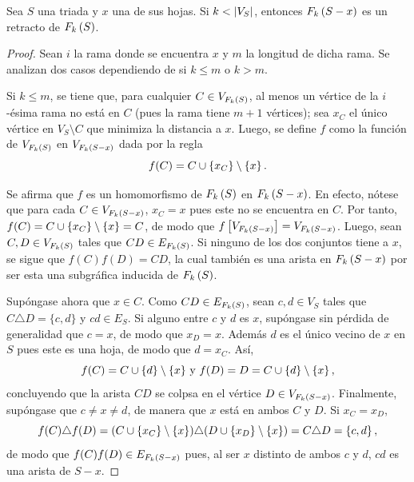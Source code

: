 \begin{lema}
\label{lem:retracto_triada}
    Sea $S$ una triada y $x$ una de sus hojas. Si $k<\left|V_S\right|$, entonces
    $F_{k}\left( S-x\right)$ es un retracto de $F_{k}\left( S\right)$.
\end{lema}

\begin{proof}
    Sean $i$ la rama donde se encuentra $x$ y $m$ la longitud de dicha rama. Se
    analizan dos casos dependiendo de si $k\leq m$ o $k>m$. 
    
    Si $k\leq m$, se tiene que, para cualquier $C\in V_{F_{k}\left( S\right)}$, al menos un
    v\'ertice de la $i$-\'esima rama no est\'a en $C$ (pues la rama tiene $m+1$
    v\'ertices); sea $x_C$ el \'unico v\'ertice en $V_S \setminus C$ que
    minimiza la distancia a $x$. Luego, se define $f$ como la funci\'on de
    $V_{F_{k}\left( S\right)}$ en $V_{F_{k}\left( S-x\right)}$ dada por la regla 
    \[
        f(C)=C\cup\left\{ x_C\right\}\setminus \left\{ x\right\}.
    \]

    Se afirma que $f$ es un homomorfismo de $F_{k}\left( S\right)$ en $F_{k}\left( S-x\right)$. En
    efecto, n\'otese que para cada $C\in V_{F_{k}\left( S-x\right)}$, $x_C=x$ pues este no
    se encuentra en $C$. Por tanto, $f(C) = C\cup\left\{ x_C\right\}\setminus \left\{ x\right\} = C$, de
    modo que $f\left[ V_{F_{k}\left( S-x\right)}\right]= V_{F_{k}\left( S-x\right)}$. Luego, sean $C,D\in
    V_{F_{k}\left( S\right)}$ tales que $CD\in E_{F_{k}\left( S\right)}$. Si ninguno de los dos
    conjuntos tiene a $x$, se sigue que $f(C)f(D)=CD$, la cual tambi\'en es una
    arista en $F_{k}\left( S-x\right)$ por ser esta una subgr\'afica inducida de $F_{k}\left( S\right)$.

    Sup\'ongase ahora que $x\in C$. Como $CD\in E_{F_{k}\left( S\right)}$, sean $c,d\in V_S$
    tales que $C\triangle D = \{c,d\}$ y $cd \in E_S$. Si alguno entre $c$ y $d$
    es $x$, sup\'ongase sin p\'erdida de generalidad que $c=x$, de modo que
    $x_D=x$. Adem\'as $d$ es el \'unico vecino de $x$ en $S$ pues este es una
    hoja, de modo que $d=x_C$. As\'i, 
    \[
        f(C)=C\cup\left\{ d\right\}\setminus\{x\} \text { y } f(D)=D = C \cup \left\{ d\right\} \setminus 
        \left\{ x\right\},
    \]
    concluyendo que la arista $CD$ se colpsa en el v\'ertice $D\in
    V_{F_{k}\left( S-x\right)}$. Finalmente, sup\'ongase que $c\neq x\neq d$, de manera que
    $x$ est\'a en ambos $C$ y $D$. Si $x_C=x_D$,
    \[
        f(C)\triangle f(D)= (C\cup\left\{ x_C\right\}\setminus \left\{ x\right\})\triangle(D\cup\left\{ x_D\right\}
        \setminus \left\{ x\right\}) = C\triangle D=\left\{ c,d\right\},
    \]
    de modo que $f(C)f(D)\in E_{F_{k}\left( S-x\right)}$ pues, al ser $x$ distinto de ambos
    $c$ y $d$, $cd$ es una arista de $S-x$. 
    

\end{proof}
